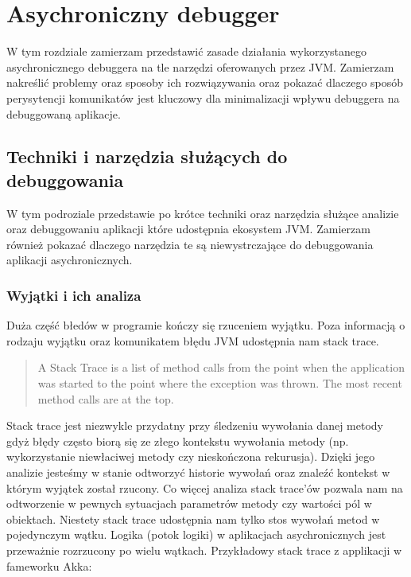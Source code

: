 \chapter{Asychroniczny debugger}

W tym rozdziale zamierzam przedstawić zasade działania wykorzystanego asychronicznego debuggera na tle narzędzi oferowanych przez JVM. Zamierzam nakreślić problemy oraz sposoby ich rozwiązywania oraz pokazać dlaczego sposób perysytencji komunikatów jest kluczowy dla minimalizacji wpływu debuggera na debuggowaną aplikacje. 


\section{Techniki i narzędzia służących do debuggowania}

W tym podroziale przedstawie po krótce techniki oraz narzędzia służące analizie oraz debuggowaniu aplikacji które udostępnia ekosystem JVM. Zamierzam również pokazać dlaczego narzędzia te są niewystrczające do debuggowania aplikacji asychronicznych.

\subsection{Wyjątki i ich analiza}
Duża część błedów w programie kończy się rzuceniem wyjątku. Poza informacją o rodzaju wyjątku oraz komunikatem błędu JVM udostępnia nam stack trace.

\begin{quote}
A Stack Trace is a list of method calls from the point when the application was started to the point where the exception was thrown. The most recent method calls are at the top.~\cite{javaProgramming}
\end{quote} 

Stack trace jest niezwykle przydatny przy śledzeniu wywołania danej metody gdyż błędy często biorą się ze złego kontekstu wywołania metody (np. wykorzystanie niewłaciwej metody czy nieskończona rekurusja). Dzięki jego analizie jesteśmy w stanie odtworzyć historie wywołań oraz znaleźć kontekst w którym wyjątek został rzucony. Co więcej analiza stack trace'ów pozwala nam na odtworzenie w pewnych sytuacjach parametrów metody czy wartości pól w obiektach.
Niestety stack trace udostępnia nam tylko stos wywołań metod w pojedynczym wątku. Logika (potok logiki) w aplikacjach asychronicznych jest przeważnie rozrzucony po wielu wątkach. Przykładowy stack trace z applikacji w fameworku Akka:

